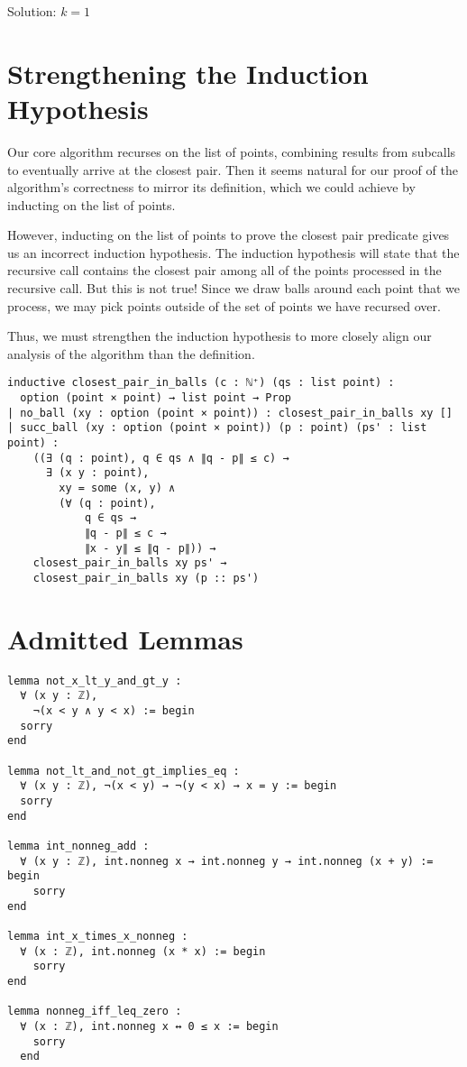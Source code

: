 \documentclass{article}
\begin{document}
Solution: $k=1$

\section{Strengthening the Induction Hypothesis}
Our core algorithm recurses on the list of points, combining results from subcalls to eventually arrive at the closest pair.
Then it seems natural for our proof of the algorithm's correctness to mirror its definition, which we could achieve by inducting on the list of points.

However, inducting on the list of points to prove the closest pair predicate gives us an incorrect induction hypothesis.
The induction hypothesis will state that the recursive call contains the closest pair among all of the points processed in the recursive call.
But this is not true!
Since we draw balls around each point that we process, we may pick points outside of the set of points we have recursed over.

Thus, we must strengthen the induction hypothesis to more closely align our analysis of the algorithm than the definition.

\begin{verbatim}
inductive closest_pair_in_balls (c : ℕ⁺) (qs : list point) :
  option (point × point) → list point → Prop
| no_ball (xy : option (point × point)) : closest_pair_in_balls xy []
| succ_ball (xy : option (point × point)) (p : point) (ps' : list point) :
    ((∃ (q : point), q ∈ qs ∧ ∥q - p∥ ≤ c) →
      ∃ (x y : point),
        xy = some (x, y) ∧
        (∀ (q : point),
            q ∈ qs →
            ∥q - p∥ ≤ c →
            ∥x - y∥ ≤ ∥q - p∥)) →
    closest_pair_in_balls xy ps' →
    closest_pair_in_balls xy (p :: ps')
\end{verbatim}

\section{Admitted Lemmas}
\begin{verbatim}
lemma not_x_lt_y_and_gt_y :
  ∀ (x y : ℤ),
    ¬(x < y ∧ y < x) := begin
  sorry
end

lemma not_lt_and_not_gt_implies_eq :
  ∀ (x y : ℤ), ¬(x < y) → ¬(y < x) → x = y := begin
  sorry
end

lemma int_nonneg_add :
  ∀ (x y : ℤ), int.nonneg x → int.nonneg y → int.nonneg (x + y) := begin
    sorry
end

lemma int_x_times_x_nonneg :
  ∀ (x : ℤ), int.nonneg (x * x) := begin
    sorry
end

lemma nonneg_iff_leq_zero :
  ∀ (x : ℤ), int.nonneg x ↔ 0 ≤ x := begin
    sorry
  end
\end{verbatim}
\end{document}

